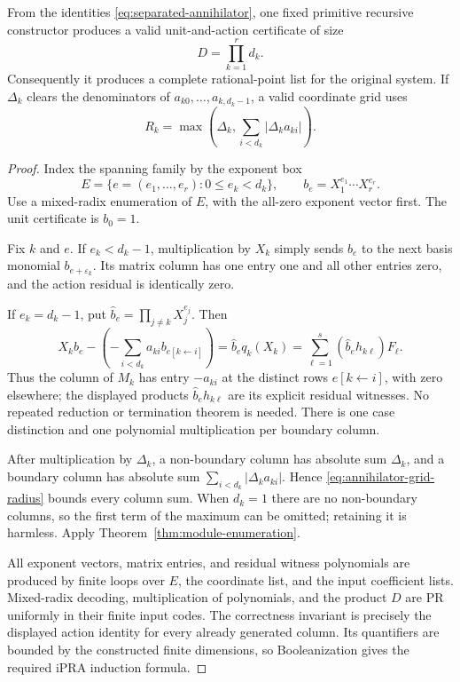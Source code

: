 \begin{theorem}
\label{thm:annihilator-to-module}
From the identities \eqref{eq:separated-annihilator}, one fixed
primitive recursive constructor produces a valid unit-and-action
certificate of size
\[
                         D=\prod_{k=1}^r d_k.
\]
Consequently it produces a complete rational-point list for the
original system.  If $\Delta_k$ clears the denominators of
$a_{k0},\ldots,a_{k,d_k-1}$, a valid coordinate grid uses
\[
 R_k=\max\left(\Delta_k,
               \sum_{i<d_k}|\Delta_k a_{ki}|\right).
 \label{eq:annihilator-grid-radius}
\]
\end{theorem}

\begin{proof}
Index the spanning family by the exponent box
\[
 E=\{e=(e_1,\ldots,e_r):0\le e_k<d_k\},
 \qquad b_e=X_1^{e_1}\cdots X_r^{e_r}.
\]
Use a mixed-radix enumeration of $E$, with the all-zero exponent vector
first.  The unit certificate is $b_0=1$.

Fix $k$ and $e$.  If $e_k<d_k-1$, multiplication by $X_k$
simply sends $b_e$ to the next basis monomial $b_{e+\varepsilon_k}$.
Its matrix column has one entry one and all other entries zero, and
the action residual is identically zero.

If $e_k=d_k-1$, put $\widehat b_e=\prod_{j\ne k}X_j^{e_j}$.
Then
\[
 X_kb_e
   -\left(-\sum_{i<d_k}a_{ki}b_{e[k\leftarrow i]}\right)
   =\widehat b_e q_k(X_k)
   =\sum_{\ell=1}^s
       (\widehat b_e h_{k\ell})F_\ell.
\]
Thus the column of $M_k$ has entry $-a_{ki}$ at the distinct rows
$e[k\leftarrow i]$, with zero elsewhere; the displayed products
$\widehat b_eh_{k\ell}$ are its explicit residual witnesses.
No repeated reduction or termination theorem is needed.  There is
one case distinction and one polynomial multiplication per boundary
column.

After multiplication by $\Delta_k$, a non-boundary column has
absolute sum $\Delta_k$, and a boundary column has absolute sum
$\sum_{i<d_k}|\Delta_ka_{ki}|$.  Hence
\eqref{eq:annihilator-grid-radius} bounds every column sum.
When $d_k=1$ there are no non-boundary columns, so the first term
of the maximum can be omitted; retaining it is harmless.
Apply Theorem~\ref{thm:module-enumeration}.

All exponent vectors, matrix entries, and residual witness polynomials
are produced by finite loops over $E$, the coordinate list, and the
input coefficient lists.  Mixed-radix decoding, multiplication of
polynomials, and the product $D$ are PR uniformly in their finite
input codes.  The correctness invariant is precisely the displayed
action identity for every already generated column.  Its quantifiers
are bounded by the constructed finite dimensions, so Booleanization
gives the required iPRA induction formula.
\end{proof}

